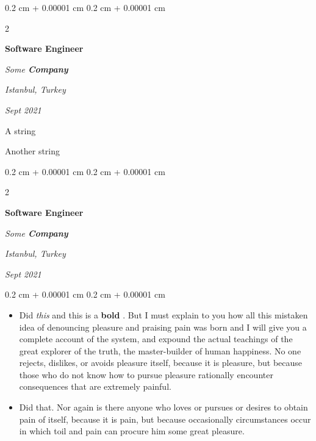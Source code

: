 \documentclass[10pt, letterpaper]{article}
\newenvironment{summary}{
    \begin{description}[
        topsep=0.10 cm,
        parsep=0.10 cm,
        partopsep=0pt,
        itemsep=0pt,
        leftmargin=0.4 cm + 10pt
    ]
}{
    \end{description}
} %
\newenvironment{highlights}{
    \begin{itemize}[
        topsep=0.10 cm,
        parsep=0.10 cm,
        partopsep=0pt,
        itemsep=0pt,
        leftmargin=0.4 cm + 10pt
    ]
}{
    \end{itemize}
} %
\newenvironment{onecolentry}{
    \begin{adjustwidth}{
        0.2 cm + 0.00001 cm
    }{
        0.2 cm + 0.00001 cm
    }
}{
    \end{adjustwidth}
} %
\newenvironment{twocolentry}[2][]{
    \onecolentry
    \def\secondColumn{#2}
    \setcolumnwidth{\fill, 4.5 cm}
    \begin{paracol}{2}
}{
    \switchcolumn \raggedleft \secondColumn
    \end{paracol}
    \endonecolentry
} %
\let\hrefWithoutArrow\href
\renewcommand{\href}[2]{\hrefWithoutArrow{#1}{\ifthenelse{\equal{#2}{}}{ }{#2 }\raisebox{.15ex}{\footnotesize \faExternalLink*}}}
\begin{document}
        \vspace{0.2 cm}

        \begin{twocolentry}{
        \textit{Istanbul, Turkey}    
            
        \textit{Sept 2021}}
            \textbf{Software Engineer}
            
            \textit{Some \textbf{Company}}
        \end{twocolentry}
            \begin{summary}
                \item A string
                \item Another string
            \end{summary}


        \vspace{0.2 cm}

        \begin{twocolentry}{
        \textit{Istanbul, Turkey}    
            
        \textit{Sept 2021}}
            \textbf{Software Engineer}
            
            \textit{Some \textbf{Company}}
        \end{twocolentry}
        \vspace{0.10 cm}
        \begin{onecolentry}
            \begin{highlights}
                \item Did \textit{this} and this is a \textbf{bold} \href{https://example.com}{link}. But I must explain to you how all this mistaken idea of denouncing pleasure and praising pain was born and I will give you a complete account of the system, and expound the actual teachings of the great explorer of the truth, the master-builder of human happiness. No one rejects, dislikes, or avoids pleasure itself, because it is pleasure, but because those who do not know how to pursue pleasure rationally encounter consequences that are extremely painful.
                \item Did that. Nor again is there anyone who loves or pursues or desires to obtain pain of itself, because it is pain, but because occasionally circumstances occur in which toil and pain can procure him some great pleasure.
            \end{highlights}
        \end{onecolentry}


        \vspace{0.2 cm}
\end{document}
